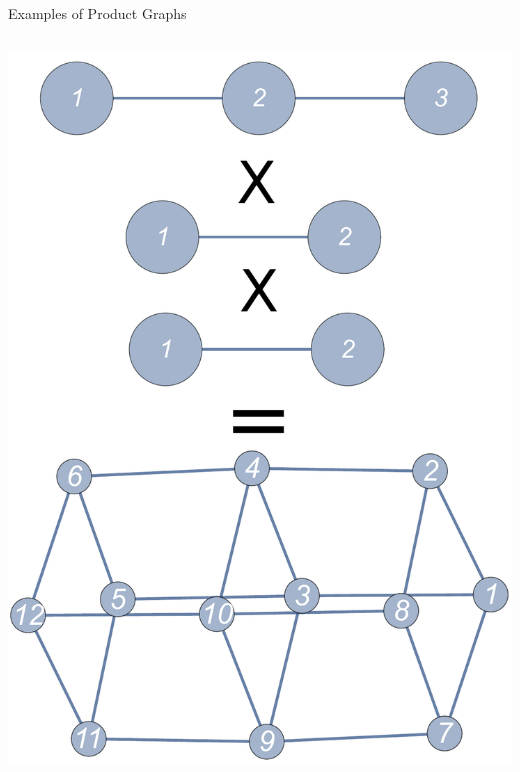 \documentclass{beamer}
\begin{document}
\begin{frame}{Examples of Product Graphs}
\begin{columns}[T]
{\begin{column}{0.33\textwidth}
    		\includegraphics[trim=0 0 0 -10mm, width=\textwidth]{Images/graphprod_chain3_chain2_square}
		\end{column}}
\end{columns}
\end{frame}
\end{document}
